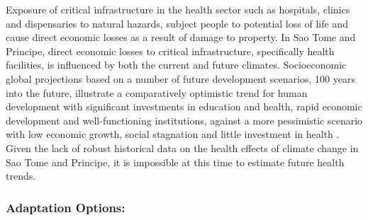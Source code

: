 \documentclass[
]{book}
\begin{document}
Exposure of critical infrastructure in the health sector such as hospitals, clinics and dispensaries to natural hazards, subject people to potential loss of life and cause direct economic losses as a result of damage to property. In Sao Tome and Principe, direct economic losses to critical infrastructure, specifically health facilities, is influenced by both the current and future climates. Socioeconomic global projections based on a number of future development scenarios, 100 years into the future, illustrate a comparatively optimistic trend for human development with significant investments in education and health, rapid economic development and well-functioning institutions, against a more pessimistic scenario with low economic growth, social stagnation and little investment in health . Given the lack of robust historical data on the health effects of climate change in Sao Tome and Principe, it is impossible at this time to estimate future health trends.

\hypertarget{adaptation-options-17}{%
\subsubsection{Adaptation Options:}\label{adaptation-options-17}}
\end{document}
